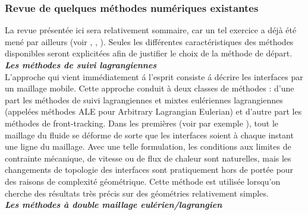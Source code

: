 \subsubsection{Revue de quelques m\'ethodes num\'eriques existantes}
La revue pr\'esent\'ee ici sera relativement sommaire, car un tel exercice a d\'ej\`a \'et\'e men\'e par ailleurs (voir \cite{Jamet2002}, \cite{Duquennoy2000}, \cite{Lebaigue1998}). Seules les diff\'erentes caract\'eristiques des m\'ethodes disponibles seront explicit\'ees afin de justifier le choix de la m\'ethode de d\'epart.\smallskip \\

\textit{\textbf{Les m\'ethodes de suivi lagrangiennes}}\smallskip \\

L'approche qui vient imm\'ediatement \'a l'esprit consiste \'a d\'ecrire les interfaces par un maillage mobile. Cette approche conduit \`a deux classes de m\'ethodes : d'une part les m\'ethodes de suivi lagrangiennes et mixtes eul\'eriennes lagrangiennes (appel\'ees m\'ethodes ALE pour Arbitrary Lagrangian Eulerian) et d'autre part les m\'ethodes de front-tracking. Dans les premi\`eres (voir par exemple \cite{Maury1996}), tout le maillage du fluide se d\'eforme de sorte que les interfaces soient \`a chaque instant une ligne du maillage. Avec une telle formulation, les conditions aux limites de contrainte m\'ecanique, de vitesse ou de flux de chaleur sont naturelles, mais les changements de topologie des interfaces sont pratiquement hors de port\'ee pour des raisons de complexit\'e g\'eom\'etrique. Cette m\'ethode est utilis\'ee lorsqu'on cherche des r\'esultats très pr\'ecis sur des g\'eom\'etries relativement simples.\smallskip \\

\textit{\textbf{Les m\'ethodes \`a double maillage eul\'erien/lagrangien}}\smallskip \\

